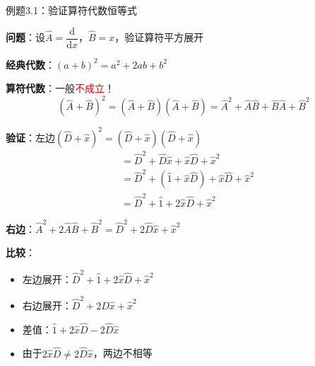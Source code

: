 \documentclass[aspectratio=169, 10pt]{beamer}
\begin{document}
\begin{frame}{例题3.1：验证算符代数恒等式}
  

  \textbf{问题}：设$\hat{A} = \dfrac{\mathrm{d}}{\mathrm{d}x}$，$\hat{B} = x$，验证算符平方展开

  \iqbsep

  \begin{iqbitemize}
    \item \textbf{经典代数}：$(a+b)^2 = a^2 + 2ab + b^2$

    \item \textbf{算符代数}：一般\textcolor{red}{不成立}！
    \[
      (\hat{A} + \hat{B})^2 = (\hat{A} + \hat{B})(\hat{A} + \hat{B}) = \hat{A}^2 + \hat{A}\hat{B} + \hat{B}\hat{A} + \hat{B}^2
    \]

    \item \textbf{验证}：左边$(\hat{D} + \hat{x})^2 = (\hat{D} + \hat{x})(\hat{D} + \hat{x})$
    \begin{align*}
      &= \hat{D}^2 + \hat{D}\hat{x} + \hat{x}\hat{D} + \hat{x}^2 \\
      &= \hat{D}^2 + (\hat{1} + \hat{x}\hat{D}) + \hat{x}\hat{D} + \hat{x}^2 \\
      &= \hat{D}^2 + \hat{1} + 2\hat{x}\hat{D} + \hat{x}^2
    \end{align*}

    \item \textbf{右边}：$\hat{A}^2 + 2\hat{A}\hat{B} + \hat{B}^2 = \hat{D}^2 + 2\hat{D}\hat{x} + \hat{x}^2$

    \item \textbf{比较}：
    \begin{itemize}
      \setlength{\itemsep}{0.05cm}
      \item 左边展开：$\hat{D}^2 + \hat{1} + 2\hat{x}\hat{D} + \hat{x}^2$
      \item 右边展开：$\hat{D}^2 + 2\hat{D}\hat{x} + \hat{x}^2$
      \item 差值：$\hat{1} + 2\hat{x}\hat{D} - 2\hat{D}\hat{x}$
      \item 由于$2\hat{x}\hat{D} \neq 2\hat{D}\hat{x}$，两边不相等
    \end{itemize}
  \end{iqbitemize}

\end{frame}
\end{document}

